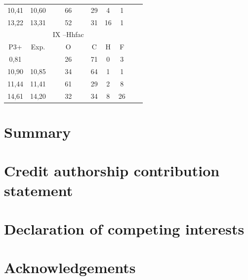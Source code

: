 \documentclass[a4paper,fleqn]{cas-dc}
\begin{document}
\begin{table}[t]
\begin{tabular}{@{}ccccccll@{}}
    10,41  & 10,60 & 66            & 29 & 4  & 1  &  &  \\
    13,22  & 13,31 & 52            & 31 & 16 & 1  &  &  \\\midrule
           &       & IX –Hhfac     &    &    &    &  &  \\
    P3+    & Exp.  & O             & C  & H  & F  &  &  \\\midrule
    0,81   &       & 26            & 71 & 0  & 3  &  &  \\
    10,90  & 10,85 & 34            & 64 & 1  & 1  &  &  \\
    11,44  & 11,41 & 61            & 29 & 2  & 8  &  &  \\
    14,61  & 14,20 & 32            & 34 & 8  & 26 &  &  \\\bottomrule 
    \end{tabular}
    \end{table}

\section{Summary}
\section*{Credit authorship contribution statement}
\section*{Declaration of competing interests}
\section*{Acknowledgements}
\end{document}
